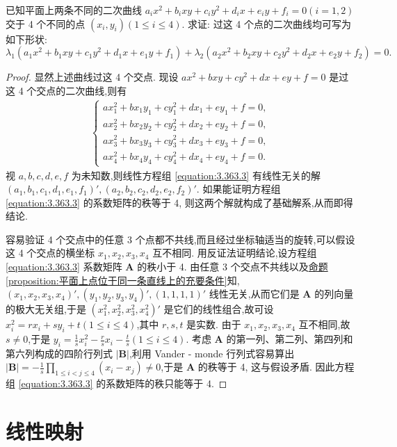\documentclass[lang=cn,newtx,10pt,scheme=chinese]{elegantbook}
\begin{document}
\begin{example}
已知平面上两条不同的二次曲线 \(a_ix^2 + b_ixy + c_iy^2 + d_ix + e_iy + f_i = 0(i = 1,2)\) 交于 4 个不同的点 \((x_i,y_i)(1\leq i\leq 4)\). 求证: 过这 4 个点的二次曲线均可写为如下形状:
\[
\lambda_1(a_1x^2 + b_1xy + c_1y^2 + d_1x + e_1y + f_1)+\lambda_2(a_2x^2 + b_2xy + c_2y^2 + d_2x + e_2y + f_2)=0.
\]
\end{example}
\begin{proof}
显然上述曲线过这 4 个交点. 现设 \(ax^2 + bxy + cy^2 + dx + ey + f = 0\) 是过这 4 个交点的二次曲线,则有
\begin{align}\label{equation:3.363.3}
    \begin{cases}
ax_1^2 + bx_1y_1 + cy_1^2 + dx_1 + ey_1 + f = 0,\\
ax_2^2 + bx_2y_2 + cy_2^2 + dx_2 + ey_2 + f = 0,\\
ax_3^2 + bx_3y_3 + cy_3^2 + dx_3 + ey_3 + f = 0,\\
ax_4^2 + bx_4y_4 + cy_4^2 + dx_4 + ey_4 + f = 0.
\end{cases}
\end{align}
视 \(a,b,c,d,e,f\) 为未知数,则线性方程组 \eqref{equation:3.363.3} 有线性无关的解 \((a_1,b_1,c_1,d_1,e_1,f_1)',(a_2,b_2,c_2,d_2,e_2,f_2)'\). 如果能证明方程组 \eqref{equation:3.363.3} 的系数矩阵的秩等于 4, 则这两个解就构成了基础解系,从而即得结论.

容易验证 4 个交点中的任意 3 个点都不共线,而且经过坐标轴适当的旋转,可以假设这 4 个交点的横坐标 \(x_1,x_2,x_3,x_4\) 互不相同. 用反证法证明结论,设方程组 \eqref{equation:3.363.3} 系数矩阵 \(\boldsymbol{A}\) 的秩小于 4. 由任意 3 个交点不共线以及\hyperref[proposition:平面上点位于同一条直线上的充要条件]{命题\ref{proposition:平面上点位于同一条直线上的充要条件}}知,\((x_1,x_2,x_3,x_4)',(y_1,y_2,y_3,y_4)',(1,1,1,1)'\) 线性无关,从而它们是 \(\boldsymbol{A}\) 的列向量的极大无关组,于是 \((x_1^2,x_2^2,x_3^2,x_4^2)'\) 是它们的线性组合,故可设 \(x_i^2 = rx_i + sy_i + t(1\leq i\leq 4)\),其中 \(r,s,t\) 是实数. 由于 \(x_1,x_2,x_3,x_4\) 互不相同,故 \(s\neq 0\),于是 \(y_i = \frac{1}{s}x_i^2 - \frac{r}{s}x_i - \frac{t}{s}(1\leq i\leq 4)\). 考虑 \(\boldsymbol{A}\) 的第一列、第二列、第四列和第六列构成的四阶行列式 \(|\boldsymbol{B}|\),利用 Vander - monde 行列式容易算出 \(|\boldsymbol{B}|=-\frac{1}{s}\prod_{1\leq i < j\leq 4}(x_i - x_j)\neq 0\),于是 \(\boldsymbol{A}\) 的秩等于 4, 这与假设矛盾. 因此方程组 \eqref{equation:3.363.3} 的系数矩阵的秩只能等于 4.
\end{proof}


\chapter{线性映射}
\end{document}
